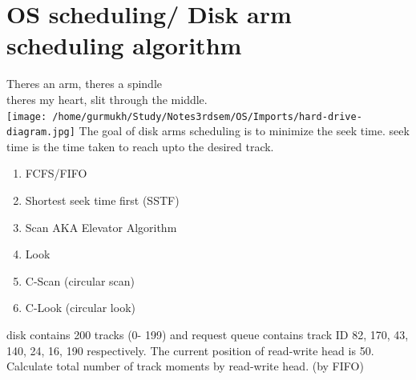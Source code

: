 \documentclass[12pt,letterpaper]{article}
\newenvironment{problem}[2][Problem]                                  
        {\begin{tcolorbox}[colback=white,colframe=gray!50,title=#1 #2]}
        {\end{tcolorbox}}
\begin{document}
  \section{OS scheduling/ Disk arm scheduling algorithm}
  Theres an arm, theres a spindle \\
  theres my heart, slit through the middle.\\
  \texttt{[image: /home/gurmukh/Study/Notes3rdsem/OS/Imports/hard-drive-diagram.jpg]}
  The goal of disk arms scheduling is to minimize the seek time. seek time is the time taken to reach upto the desired track. 
  \begin{enumerate}
    \item FCFS/FIFO
    \item Shortest seek time first (SSTF)
    \item Scan AKA Elevator Algorithm
    \item Look
    \item C-Scan (circular scan)
    \item C-Look (circular look)
  \end{enumerate}
  \begin{problem}
  A disk contains 200 tracks (0- 199) and request queue contains track ID 82, 170,  43, 140, 24, 16, 190 respectively. The current position of read-write head is 50. Calculate total number of track moments by read-write head. (by FIFO)
  \end{problem}
      
\end{document}
